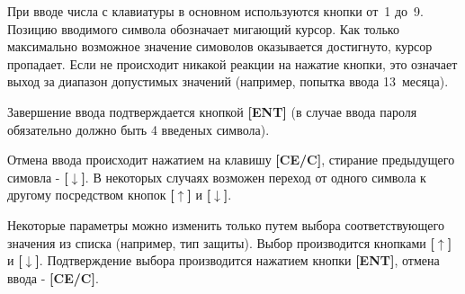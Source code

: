 При вводе числа с клавиатуры в основном используются кнопки от~1 до~9. Позицию вводимого символа обозначает мигающий курсор. Как только максимально возможное значение симоволов оказывается достигнуто, курсор пропадает. Если не происходит никакой реакции на нажатие кнопки, это означает выход за диапазон допустимых значений (например, попытка ввода 13~месяца).

Завершение ввода подтверждается кнопкой \textbf{[ENT]} (в случае ввода пароля обязательно должно быть 4 введеных символа).

Отмена ввода происходит нажатием на клавишу \textbf{[CE/C]}, стирание предыдущего симовла - \textbf{[$\downarrow$]}. В некоторых случаях возможен переход от одного символа к другому посредством кнопок \textbf{[$\uparrow$]} и \textbf{[$\downarrow$]}.

Некоторые параметры можно изменить только путем выбора соответствующего значения из списка (например, тип защиты). Выбор производится кнопками \textbf{[$\uparrow$]} и \textbf{[$\downarrow$]}. Подтверждение выбора производится нажатием кнопки \textbf{[ENT]}, отмена ввода - \textbf{[CE/C]}.